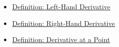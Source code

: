 \begin{remark*}[Dependencies]
\begin{itemize}
  \item \hyperref[def:left-hand-derivative]{Definition: Left-Hand Derivative}
  \item \hyperref[def:right-hand-derivative]{Definition: Right-Hand Derivative}
  \item \hyperref[def:derivative-at-a-point]{Definition: Derivative at a Point}
\end{itemize}
\end{remark*}
